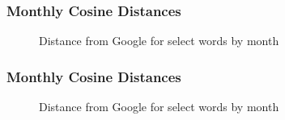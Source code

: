 \documentclass{beamer}
\begin{document}
\begin{frame}
\frametitle{Monthly Cosine Distances}
\begin{figure}
	\centering
	\caption{Distance from Google for select words by month}
\end{figure}
\end{frame}	

\begin{frame}
\frametitle{Monthly Cosine Distances}
\begin{figure}
	\centering
	\caption{Distance from Google for select words by month}
\end{figure}
\end{frame}	
\end{document}
